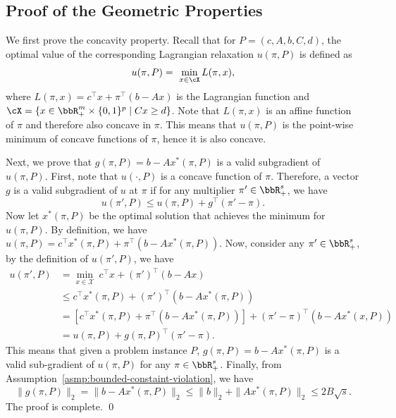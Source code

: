 \subsection{Proof of the Geometric Properties} \label{sec:app-geometric}


    We first prove the concavity property. Recall that for $P = (c, A, b, C, d)$, the optimal value of the corresponding Lagrangian relaxation $u(\pi, P)$ is defined as
    \[
        u(\pi, P) = \ \min_{x \in \cX} L(\pi, x),
    \]
    where $L(\pi, x) = c^\top x + \pi^\top (b - Ax)$ is the Lagrangian function 
    and $\cX = \{x \in \bbR^m_+ \times \{0, 1\}^p \mid Cx \geq d\}$. Note that $L(\pi, x)$ is an affine function of $\pi$ and therefore also concave in $\pi$. This means that $u(\pi, P)$ is the point-wise minimum of concave functions of $\pi$, hence it is also concave. 
    
    Next, we prove that $g(\pi, P) = b - Ax^*(\pi, P)$ is a valid subgradient of $u(\pi, P)$. First, note that $u(\cdot, P)$ is a concave function of $\pi$. Therefore, a vector $g$ is a valid subgradient of $u$ at $\pi$ if for any multiplier $\pi' \in \bbR^s_+$, we have
    \[
        u(\pi', P) \leq u(\pi, P) + g^\top (\pi' - \pi). 
    \]
    Now let $x^*(\pi, P)$ be the optimal solution that achieves the minimum for $u(\pi, P)$. By definition, we have $u(\pi, P) = c^\top x^*(\pi, P) + \pi^\top (b - Ax^*(\pi, P))$. Now, consider any $\pi' \in \bbR^s_+$, by the definition of $u(\pi', P)$, we have
    \begin{equation*}
        \begin{aligned}
            u(\pi', P) &= \min_{x \in \mathcal X} ~c^\top x + (\pi')^\top (b - Ax) \\
            &\leq c^\top x^*(\pi, P) + (\pi')^\top (b - Ax^*(\pi, P)) \\
            &= \left[c^\top x^*(\pi, P) + \pi^\top (b - Ax^*(\pi, P))\right]  + (\pi' - \pi)^\top (b - Ax^*(x, P)) \\
            &= u(\pi, P) + g(\pi, P)^\top (\pi' - \pi).
        \end{aligned}
    \end{equation*}
    This means that given a problem instance $P$, $g(\pi, P) = b - Ax^*(\pi, P)$ is a valid sub-gradient of $u(\pi, P)$ for any $\pi \in \bbR^s_+$. Finally, from Assumption~\ref{asmp:bounded-constaint-violation}, we have 
    \begin{equation*}
            \|g(\pi, P)\|_2 = \|b - Ax^*(\pi, P)\|_2 \leq \|b\|_2 + \|Ax^*(\pi, P)\|_2 \leq 2B\sqrt{s}.
    \end{equation*}
    The proof is complete.
\qed

